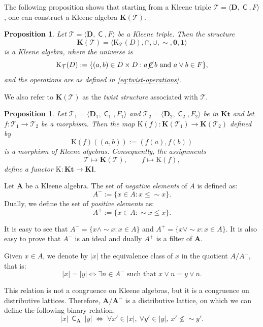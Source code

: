 \documentclass{article}
\newtheorem{proposition}[theorem]{Proposition}
\DeclareMathOperator{\con}{\mathsf{C}}
\DeclareMathOperator{\notcon}{\cancel{ \con}}
\newcommand{\KC}[1]{\mathrm{K}_\T(#1)}
\newcommand{\one}{\mathbf{1}}
\newcommand{\zero}{\mathbf{0}}
\newcommand{\A}{\mathbf{A}}
\newcommand{\D}{\mathbf{D}}
\newcommand{\T}{\mathcal{T}}
\begin{document}
The following proposition shows that starting from a Kleene triple $\T = \langle \D, \con, F \rangle$, one can construct a Kleene algebra $\mathbf{K}(\T)$.

\begin{proposition}
\label{prop:twist-kleene}
Let $\T = \langle \D, \con, F \rangle$ be a Kleene triple. Then the structure
\[
\mathbf{K}(\T) = \langle \KC{D}, \cap, \cup, \sim, \zero, \one \rangle
\]
is a Kleene algebra, where the universe is
\[
\KC{D} := \{ (a, b) \in D \times D : a\notcon b \text{ and } a \vee b \in F \},
\]
and the operations are as defined in \ref{eq:twist-operations}.
\end{proposition}

We also refer to $\mathbf{K}(\T)$ as the \emph{twist structure} associated with $\T$.

\begin{proposition}
\label{prop:Kfunctor-mor}
Let $\T_1=\langle \D_1,\con_1,F_1\rangle$ and $\T_2=\langle \D_2,\con_2,F_2\rangle$ be in $ \mathbf{Kt}$ and let $f \colon \T_1 \to  \T_2$ be a morphism. Then the map $\mathrm{K}(f) \colon \mathbf{K}(\T_1) \to \mathbf{K}(\T_2)$ defined by
\[
    \mathrm{K}(f)((a, b)) := (f(a), f(b))
\]
is a morphism of Kleene algebras. Consequently, the assignments
\[
\T\mapsto\mathbf{K}(\T),
\qquad
f\mapsto\mathrm{K}(f),
\]
define a functor $\mathrm{K}:\mathbf{Kt}\to\mathbf{Kl}$. 
\end{proposition}

Let $\A$ be a Kleene algebra. The set of \emph{negative elements} of $A$ is defined as:
\[
A^{-}:= \{ x \in A : x \leq \sim x \}.
\]
Dually, we define the set of \emph{positive elements} as:
\[
A^{+}  := \{ x \in A : \sim x \leq x \}.
\]

It is easy to see that $A^{-}= \{ x \wedge \sim x : x \in A \}$ and $A^{+}= \{ x \vee \sim x : x \in A \}$. It is also easy to prove that $A^{-}$ is an ideal and dually $A^{+}$ is a filter of $\A$.


Given $x \in A$, we denote by $|x|$ the equivalence class of $x$ in the quotient $A / A^{-}$, that is:
\begin{equation}
\label{eq:nega-quotient}
    |x| = |y| \iff \exists n \in A^{-}\text{ such that } x \vee n = y \vee n.
\end{equation}

This relation is not a congruence on Kleene algebras, but it is a congruence on distributive lattices. Therefore, $\mathbf{A / A^{-}}$  is a distributive lattice, on which we can define the following binary relation:
\begin{equation}\label{def:contact-quotient}
|x|\ \con_\A\ |y| \;\Longleftrightarrow\;
\forall x' \in |x|,\ \forall y' \in |y|,\ x' \nleq \sim y'.
\end{equation}
\end{document}
